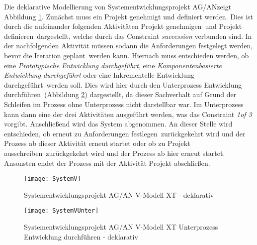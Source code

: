 {Die deklarative Modellierung von \grqq Systementwicklungsprojekt AG/AN\grqq  zeigt Abbildung \ref{fig:SystemV}. \newline
Zunächst muss ein Projekt genehmigt und definiert werden. Dies ist durch die aufeinander folgenden Aktivitäten \grqq Projekt genehmigen\grqq \ und \grqq Projekt definieren\grqq \ dargestellt, welche durch das Constraint \textit{succession} verbunden sind.\newline
In der nachfolgenden Aktivität müssen sodann die \grqq Anforderungen festgelegt werden\grqq, bevor die \grqq Iteration geplant\grqq \ werden kann. \newline
Hiernach muss entschieden werden, ob eine \textit{Prototypische Entwicklung durchgeführt}, eine \textit{Komponentenbasierte Entwicklung durchgeführt} oder eine \grqq Inkrementelle Entwicklung durchgeführt\grqq \ werden soll. Dies wird hier durch den Unterprozess \grqq Entwicklung durchführen\grqq \ (Abbildung \ref{fig:SystemVUnter}) dargestellt, da dieser Sachverhalt auf Grund der Schleifen im Prozess ohne Unterprozess nicht darstellbar war. Im Unterprozess kann dann eine der drei Aktivitäten ausgeführt werden, was das Constraint \textit{1of 3} vorgibt.\newline
Anschließend wird das \grqq System abgenommen\grqq.
An dieser Stelle wird entschieden, ob erneut zu \grqq Anforderungen festlegen\grqq \ zurückgekehrt wird und der Prozess ab dieser Aktivität erneut startet oder ob zu \grqq Projekt ausschreiben\grqq \ zurückgekehrt wird und der Prozess ab hier erneut startet. Ansonsten endet der Prozess mit der Aktivität \grqq Projekt abschließen\grqq.

\begin{figure}[!htbp]
\begin{center}
  \texttt{[image: SystemV]} %
  \caption{Systementwicklungsprojekt AG/AN  V-Modell XT - deklarativ}
  \label{fig:SystemV}
\end{center}
\end{figure}

\begin{figure}[!htbp]
\begin{center}
  \texttt{[image: SystemVUnter]} %
  \caption{Systementwicklungsprojekt AG/AN  V-Modell XT Unterprozess Entwicklung durchführen - deklarativ}
  \label{fig:SystemVUnter}
\end{center}
\end{figure}



}
